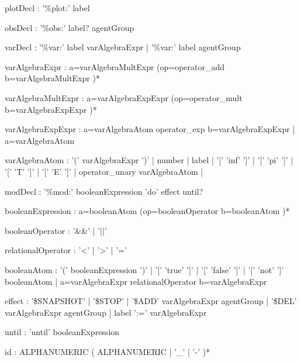 \begin{bnfsource}




plotDecl :
  '\%plot:' label

obsDecl :
  '\%obs:'  label? agentGroup

varDecl :
  '\%var:' label varAlgebraExpr
   | '\%var:'  label agentGroup

varAlgebraExpr :
  a=varAlgebraMultExpr (op=operator_add b=varAlgebraMultExpr )*
  
varAlgebraMultExpr :
  a=varAlgebraExpExpr (op=operator_mult b=varAlgebraExpExpr )*
  
varAlgebraExpExpr :
  a=varAlgebraAtom operator_exp b=varAlgebraExpExpr
  | a=varAlgebraAtom
  
varAlgebraAtom :
  '(' varAlgebraExpr ')'
  | number
  | label
  | '[' 'inf' ']'
  | '[' 'pi' ']'
  | '[' 'T' ']'
  | '[' 'E' ']'
  | operator_unary varAlgebraAtom
  | 
  
modDecl :
  '\%mod:' booleanExpression 'do' effect until?
  
booleanExpression :
  a=booleanAtom (op=booleanOperator b=booleanAtom )*
  
booleanOperator :
  '&&' | '||'

relationalOperator :
  '<' | '>' | '='

booleanAtom :
  '(' booleanExpression ')'
  | '[' 'true' ']'
  | '[' 'false' ']'
  | '[' 'not' ']' booleanAtom
  | a=varAlgebraExpr relationalOperator b=varAlgebraExpr

effect :
  '\$SNAPSHOT'
  | '\$STOP'
  | '\$ADD' varAlgebraExpr agentGroup
  | '\$DEL' varAlgebraExpr agentGroup
  | label ':=' varAlgebraExpr
  
until :
  'until' booleanExpression
  
  
  
id :
  ALPHANUMERIC ( ALPHANUMERIC | '_' | '-' )* 


\end{bnfsource}
